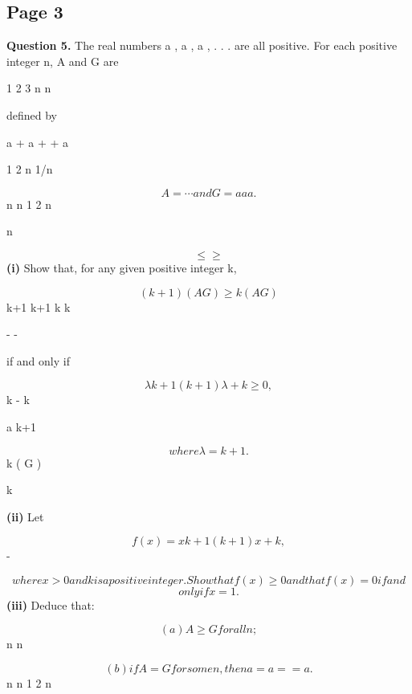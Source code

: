 \documentclass[12pt]{article}
\begin{document}
\subsection*{Page 3}
\begin{flushleft}
\bigskip\textbf{Question 5.} The real numbers a , a , a , . . . are all positive. For each positive integer n, A and G are\par
1 2 3 n n\par
defined by\par
a + a + + a\par
1 2 n 1/n\par
\[A = \cdots and G = a a a .\]
n n 1 2 n\par
n \cdots\par
\[\leq \geq\]
\textbf{(i)} Show that, for any given positive integer k,\par
\[(k + 1)(A G ) \geq k(A G )\]
k+1 k+1 k k\par
- -\par
if and only if\par
\[λk+1 (k + 1)λ + k \geq 0 ,\]
k - k\par
a k+1\par
\[where λ = k+1 .\]
k ( G )\par
k\par
\textbf{(ii)} Let\par
\[f(x) = xk+1 (k + 1)x + k ,\]
-\par
\[where x > 0 and k is a positive integer. Show that f(x) \geq 0 and that f(x) = 0 if and\]
\[only if x = 1 .\]
\textbf{(iii)} Deduce that:\par
\[(a) A \geq G for all n;\]
n n\par
\[(b) if A = G for some n, then a = a = = a .\]
n n 1 2 n\par
\cdots\par
\end{flushleft}
\end{document}
